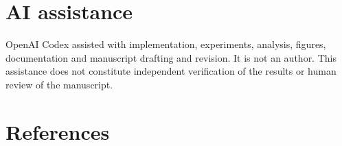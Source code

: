 \documentclass[
  british,
]{article}
\begin{document}
\section*{AI assistance}\label{ai-assistance}

OpenAI Codex assisted with implementation, experiments, analysis,
figures, documentation and manuscript drafting and revision. It is not
an author. This assistance does not constitute independent verification
of the results or human review of the manuscript.

\section*{References}\label{references}
\end{document}
